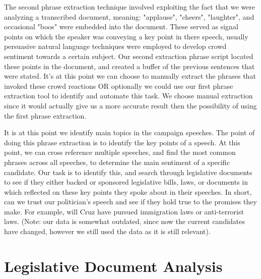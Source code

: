 \documentclass[12pt]{article}
\begin{document}
\par{The second phrase extraction technique involved exploiting the fact that we were analyzing a transcribed document, meaning: "applause", "cheers", "laughter", and occasional "boos" were embedded into the document. These served as signal points on which the speaker was conveying a key point in there speech, usually persuasive natural language techniques were employed to develop crowd sentiment towards a certain subject. Our second extraction phrase script located these points in the document, and created a buffer of the previous sentences that were stated. It's at this point we can choose to manually extract the phrases that invoked these crowd reactions OR optionally we could use our first phrase extraction tool to identify and automate this task. We choose manual extraction since it would actually give us a more accurate result then the possibility of using the first phrase extraction. }
\par{It is at this point we identify main topics in the campaign speeches. The point of doing this phrase extraction is to identify the key points of a speech. At this point, we can cross reference multiple speeches, and find the most common phrases across all speeches, to determine the main sentiment of a specific candidate. Our task is to identify this, and search through legislative documents to see if they either backed or sponsored legislative bills, laws, or documents in which reflected on these key points they spoke about in their speeches. In short, can we trust our politician's  speech and see if they hold true to the promises they make. For example, will Cruz have pursued immigration laws or anti-terrorist laws.  (Note: our data is somewhat outdated, since now the current candidates have changed, however we still used the data as it is still relevant). }

\section*{Legislative Document Analysis}
\end{document}
